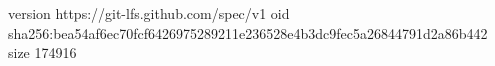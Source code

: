 version https://git-lfs.github.com/spec/v1
oid sha256:bea54af6ec70fcf6426975289211e236528e4b3dc9fec5a26844791d2a86b442
size 174916
